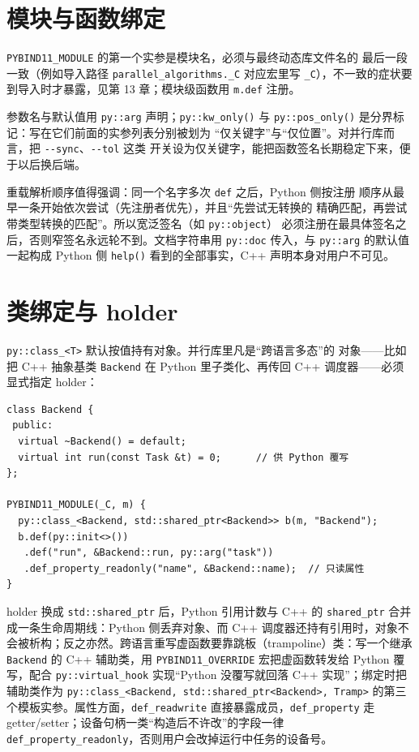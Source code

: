 \documentclass[12pt,a4paper,fontset=fandol]{ctexbook}
\newcommand{\Tp}[1]{\texttt{#1}}
\newcommand{\Opt}[1]{\texttt{-\/-#1}}
\begin{document}
\section{模块与函数绑定}

\Tp{PYBIND11\_MODULE} 的第一个实参是模块名，必须与最终动态库文件名的
最后一段一致（例如导入路径 \Tp{parallel\_algorithms.\_C} 对应宏里写
\Tp{\_C}），不一致的症状要到导入时才暴露，见第 13 章；模块级函数用
\Tp{m.def} 注册。

参数名与默认值用 \Tp{py::arg} 声明；\Tp{py::kw\_only()} 与
\Tp{py::pos\_only()} 是分界标记：写在它们前面的实参列表分别被划为
``仅关键字''与``仅位置''。对并行库而言，把 \Opt{sync}、\Opt{tol} 这类
开关设为仅关键字，能把函数签名长期稳定下来，便于以后换后端。

重载解析顺序值得强调：同一个名字多次 \Tp{def} 之后，Python 侧按注册
顺序从最早一条开始依次尝试（先注册者优先），并且``先尝试无转换的
精确匹配，再尝试带类型转换的匹配''。所以宽泛签名（如 \Tp{py::object}）
必须注册在最具体签名之后，否则窄签名永远轮不到。文档字符串用
\Tp{py::doc} 传入，与 \Tp{py::arg} 的默认值一起构成 Python 侧
\Tp{help()} 看到的全部事实，C++ 声明本身对用户不可见。

\section{类绑定与 holder}

\Tp{py::class\_<T>} 默认按值持有对象。并行库里凡是``跨语言多态''的
对象——比如把 C++ 抽象基类 \Tp{Backend} 在 Python 里子类化、再传回
C++ 调度器——必须显式指定 holder：

\begin{lstlisting}[style=cppstyle,caption={类绑定：shared\_ptr holder 与只读属性}]
class Backend {
 public:
  virtual ~Backend() = default;
  virtual int run(const Task &t) = 0;      // 供 Python 覆写
};

PYBIND11_MODULE(_C, m) {
  py::class_<Backend, std::shared_ptr<Backend>> b(m, "Backend");
  b.def(py::init<>())
   .def("run", &Backend::run, py::arg("task"))
   .def_property_readonly("name", &Backend::name);  // 只读属性
}
\end{lstlisting}

holder 换成 \Tp{std::shared\_ptr} 后，Python 引用计数与 C++ 的 \Tp{shared\_ptr} 合并成一条生命周期线：Python 侧丢弃对象、而 C++ 调度器还持有引用时，对象不会被析构；反之亦然。跨语言重写虚函数要靠跳板（trampoline）类：写一个继承 \Tp{Backend} 的 C++ 辅助类，用 \Tp{PYBIND11\_OVERRIDE} 宏把虚函数转发给 Python 覆写，配合 \Tp{py::virtual\_hook} 实现``Python 没覆写就回落 C++ 实现''；绑定时把辅助类作为 \Tp{py::class\_<Backend, std::shared\_ptr<Backend>, Tramp>} 的第三个模板实参。属性方面，\Tp{def\_readwrite} 直接暴露成员，\Tp{def\_property} 走 getter/setter；设备句柄一类``构造后不许改''的字段一律 \Tp{def\_property\_readonly}，否则用户会改掉运行中任务的设备号。
\end{document}
